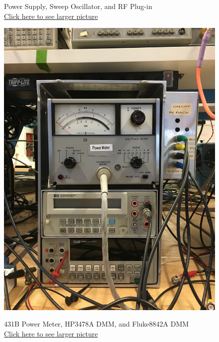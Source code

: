 \documentclass{../lab}
\begin{document}
\begin{figure}[H]
  \caption{Power Supply, Sweep Oscillator, and RF Plug-in\\ \href{http://experimentationlab.berkeley.edu/sites/default/files/JOS_3507_Power_Sweep_RF.JPG}{Click here to see larger picture}}
  \label{fig:JOS_3507_Power_Sweep_RF.jpg}
\endminipage\hfill
{}
  \href{http://experimentationlab.berkeley.edu/sites/default/files/JOS_3507_PowerMeter_DMM.JPG}{\includegraphics[width=\linewidth,keepaspectratio]{images/JOS_3507_PowerMeter_DMM.JPG}}
  \caption{431B Power Meter, HP3478A DMM, and Fluke8842A DMM\\ \href{http://experimentationlab.berkeley.edu/sites/default/files/JOS_3507_PowerMeter_DMM.JPG}{Click here to see larger picture}}
  \label{fig:JOS_3507_PowerMeter_DMM.jpg}
\endminipage
\end{figure}
\end{document}
